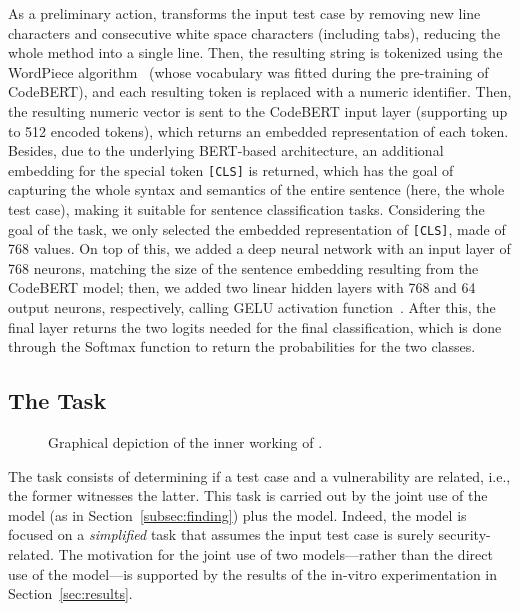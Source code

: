 As a preliminary action, \vuteco transforms the input test case by removing new line characters and consecutive white space characters (including tabs), reducing the whole method into a single line.
Then, the resulting string is tokenized using the WordPiece algorithm~\cite{wu2016googles:wordpiece} (whose vocabulary was fitted during the pre-training of CodeBERT), and each resulting token is replaced with a numeric identifier.
Then, the resulting numeric vector is sent to the CodeBERT input layer (supporting up to 512 encoded tokens), which returns an embedded representation of each token.
Besides, due to the underlying BERT-based architecture, an additional embedding for the special token \texttt{[CLS]} is returned, which has the goal of capturing the whole syntax and semantics of the entire sentence (here, the whole test case), making it suitable for sentence classification tasks.
Considering the goal of the \finding task, we only selected the embedded representation of \texttt{[CLS]}, made of 768 values.
%
On top of this, we added a deep neural network with an input layer of 768 neurons, matching the size of the sentence embedding resulting from the CodeBERT model; then, we added two linear hidden layers with 768 and 64 output neurons, respectively, calling GELU activation function~\cite{hendrycks2023gaussian:gelu}.
After this, the final layer returns the two logits needed for the final classification, which is done through the Softmax function to return the probabilities for the two classes.

\subsection{The \matching Task}
\label{subsec:matching}

\begin{figure}[t]
    \centering
    \caption{ Graphical depiction of the inner working of \vuteco.}
    \label{fig:vuteco-detail}
\end{figure}

The \matching task consists of determining if a test case and a vulnerability are related, i.e., the former witnesses the latter.
This task is carried out by the joint use of the \finder model (as in Section~\ref{subsec:finding}) plus the \linker model.
Indeed, the \linker model is focused on a \textit{simplified} task that assumes the input test case is surely security-related.
The motivation for the joint use of two models---rather than the direct use of the \linker model---is supported by the results of the in-vitro experimentation in Section~\ref{sec:results}.

